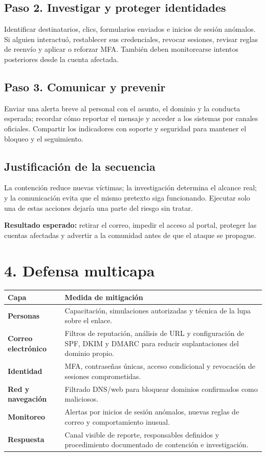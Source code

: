 \documentclass[11pt,a4paper]{article}
\newcommand{\infobox}[1]{%
  \noindent\colorbox{fondo}{\parbox{\dimexpr\textwidth-2\fboxsep}{#1}}}
\newcommand{\reportpage}{\clearpage\thispagestyle{fancy}}
\begin{document}
\subsection*{Paso 2. Investigar y proteger identidades}

Identificar destinatarios, clics, formularios enviados e inicios de sesión anómalos. Si alguien interactuó, restablecer sus credenciales, revocar sesiones, revisar reglas de reenvío y aplicar o reforzar MFA. También deben monitorearse intentos posteriores desde la cuenta afectada.

\subsection*{Paso 3. Comunicar y prevenir}

Enviar una alerta breve al personal con el asunto, el dominio y la conducta esperada; recordar cómo reportar el mensaje y acceder a los sistemas por canales oficiales. Compartir los indicadores con soporte y seguridad para mantener el bloqueo y el seguimiento.

\subsection*{Justificación de la secuencia}

La contención reduce nuevas víctimas; la investigación determina el alcance real; y la comunicación evita que el mismo pretexto siga funcionando. Ejecutar solo una de estas acciones dejaría una parte del riesgo sin tratar.

\infobox{\textcolor{seguro}{\textbf{Resultado esperado:}} retirar el correo, impedir el acceso al portal, proteger las cuentas afectadas y advertir a la comunidad antes de que el ataque se propague.}

\reportpage
\section*{4. Defensa multicapa}

\begin{tabularx}{\textwidth}{>{\raggedright\arraybackslash\bfseries\color{azul}}p{3.2cm} >{\raggedright\arraybackslash}X}
  Capa & Medida de mitigación \\
  \toprule
  Personas & Capacitación, simulaciones autorizadas y técnica de la lupa sobre el enlace. \\
  Correo electrónico & Filtros de reputación, análisis de URL y configuración de SPF, DKIM y DMARC para reducir suplantaciones del dominio propio. \\
  Identidad & MFA, contraseñas únicas, acceso condicional y revocación de sesiones comprometidas. \\
  Red y navegación & Filtrado DNS/web para bloquear dominios confirmados como maliciosos. \\
  Monitoreo & Alertas por inicios de sesión anómalos, nuevas reglas de correo y comportamiento inusual. \\
  Respuesta & Canal visible de reporte, responsables definidos y procedimiento documentado de contención e investigación. \\
\end{tabularx}
\end{document}
